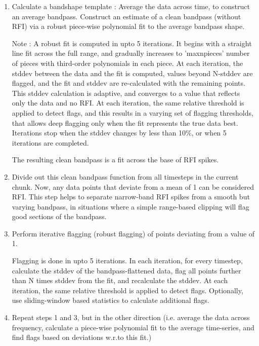 \begin{enumerate}
\item Calculate a bandshape template : Average the data across time, to
construct an average bandpass. Construct an estimate of a clean
bandpass (without RFI) via a robust piece-wise polynomial fit to the
average bandpass shape.

Note : A robust fit is computed in upto 5 iterations. It begins with a
straight line fit across the full range, and gradually increases to
'maxnpieces' number of pieces with third-order polynomials in each
piece. At each iteration, the stddev between the data and the fit is
computed, values beyond N-stddev are flagged, and the fit and stddev
are re-calculated with the remaining points. This stddev calculation
is adaptive, and converges to a value that reflects only the data and
no RFI. At each iteration, the same relative threshold is applied to
detect flags, and this results in a varying set of flagging
thresholds, that allows deep flagging only when the fit represents the
true data best. Iterations stop when the stddev changes by less than
10\%, or when 5 iterations are completed.

The resulting clean bandpass is a fit across the base of RFI spikes.

\item Divide out this clean bandpass function from all timesteps in the
current chunk. Now, any data points that deviate from a mean of 1 can
be considered RFI. This step helps to separate narrow-band RFI spikes
from a smooth but varying bandpass, in situations where a simple
range-based clipping will flag good sections of the bandpass.

\item Perform iterative flagging (robust flagging) of points deviating from
a value of 1.

Flagging is done in upto 5 iterations. In each iteration, for every
timestep, calculate the stddev of the bandpass-flattened data, flag
all points further than N times stddev from the fit, and recalculate
the stddev. At each iteration, the same relative threshold is applied
to detect flags. Optionally, use sliding-window based statistics to
calculate additional flags.

\item Repeat steps 1 and 3, but in the other direction (i.e. average the
data across frequency, calculate a piece-wise polynomial fit to the
average time-series, and find flags based on deviations w.r.to this
fit.)

\end{enumerate}

